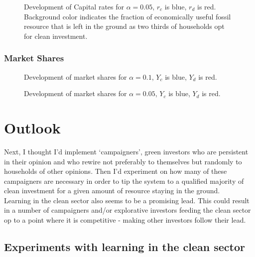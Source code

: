 \begin{figure}[t]
	\centering
	\caption{Development of Capital rates for $\alpha=0.05$, $r_c$ is blue, $r_d$ is red. Background color indicates the fraction of economically useful fossil resource that is left in the ground as two thirds of households opt for clean investment.}

\end{figure}
\subsubsection{Market Shares}
\begin{figure}[t]
	\centering
	\caption{Development of market shares for $\alpha=0.1$, $Y_c$ is blue, $Y_d$ is red.}

\end{figure}

\begin{figure}[t]
	\centering
	\caption{Development of market shares for $\alpha=0.05$, $Y_c$ is blue, $Y_d$ is red.}

\end{figure}

\section{Outlook}
Next, I thought I'd implement `campaigners', green investors who are persistent in their opinion and who rewire not preferably to themselves but randomly to households of other opinions. Then I'd experiment on how many of these campaigners are necessary in order to tip the system to a qualified majority of clean investment for a given amount of resource staying in the ground. \\

Learning in the clean sector also seems to be a promising lead. This could result in a number of campaigners and/or explorative investors feeding the clean sector op to a point where it is competitive - making other investors follow their lead.

\subsection{Experiments with learning in the clean sector}

